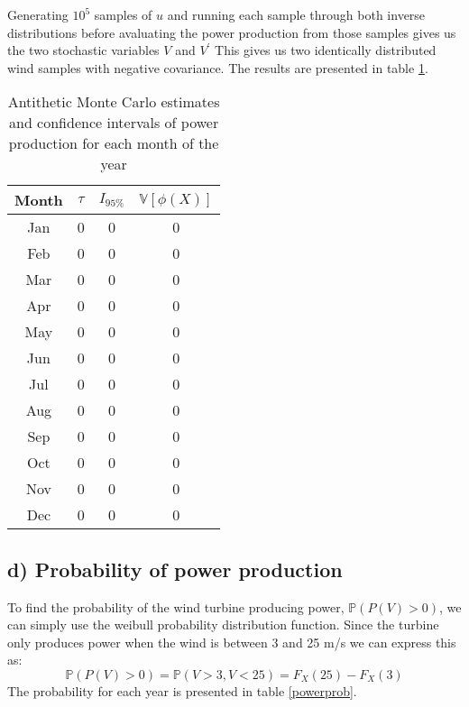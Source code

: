 \documentclass[a4paper]{article}
\begin{document}
Generating $10^5$ samples of $u$ and running each sample through both inverse distributions before avaluating the power production from those samples gives us the two stochastic variables $V$ and $V^\prime$ This gives us two identically distributed wind samples with negative covariance. The results are presented in table \ref{ATresults}.

\begin{table}
    \centering
    \caption{Antithetic Monte Carlo estimates and confidence intervals of power production for each month of the year}
    \label{ATresults}
    \begin{tabular}{|c|| c c c ||}
        \hline
        Month & $\tau$ & $I_{95\%}$ & $\mathbb{V}[\phi(X)]$ \\
        \hline\hline
        Jan & 0 & 0 & 0 \\
        \hline
        Feb & 0 & 0 & 0 \\
        \hline
        Mar & 0 & 0 & 0 \\
        \hline
        Apr & 0 & 0 & 0 \\
        \hline
        May & 0 & 0 & 0 \\
        \hline
        Jun & 0 & 0 & 0 \\
        \hline
        Jul & 0 & 0 & 0 \\
        \hline
        Aug & 0 & 0 & 0 \\
        \hline
        Sep & 0 & 0 & 0 \\
        \hline
        Oct & 0 & 0 & 0 \\
        \hline
        Nov & 0 & 0 & 0 \\
        \hline
        Dec & 0 & 0 & 0 \\
        \hline

    \end{tabular}
\end{table}

\subsection*{d) Probability of power production}
To find the probability of the wind turbine producing power, $\mathbb{P}(P(V) > 0)$, we can simply use the weibull probability distribution function. Since the turbine only produces power when the wind is between 3 and 25 m/s we can express this as:
\begin{equation}
    \mathbb{P}(P(V) > 0) = \mathbb{P}(V > 3, V < 25) = F_X(25) - F_X(3)
\end{equation}
The probability for each year is presented in table \ref{powerprob}.
\end{document}
